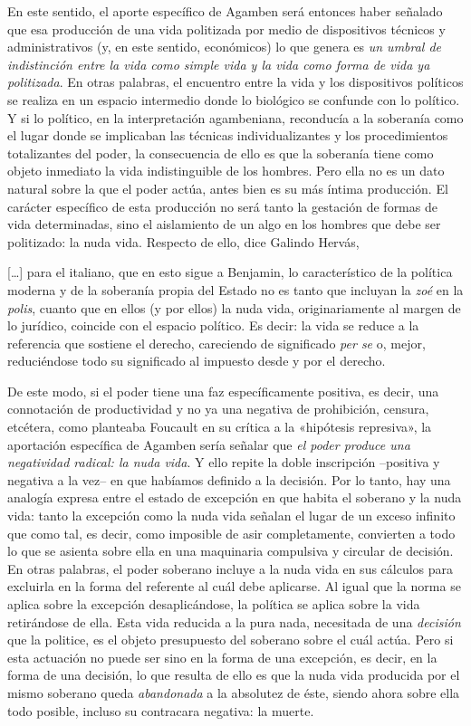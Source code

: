 En este sentido, el aporte específico de Agamben será entonces haber señalado que esa producción de una vida politizada por medio de dispositivos técnicos y administrativos (y, en este sentido, económicos) lo que genera es \emph{un umbral de indistinción entre la vida como simple vida y la vida como forma de vida ya politizada}. En otras palabras, el encuentro entre la vida y los dispositivos políticos se realiza en un espacio intermedio donde lo biológico se confunde con lo político. Y si lo político, en la interpretación agambeniana, reconducía a la soberanía como el lugar donde se implicaban las técnicas individualizantes y los procedimientos totalizantes del poder, la consecuencia de ello es que la soberanía tiene como objeto inmediato la vida indistinguible de los hombres. Pero ella no es un dato natural sobre la que el poder actúa, antes bien es su más íntima producción. El carácter específico de esta producción no será tanto la gestación de formas de vida determinadas, sino el aislamiento de un algo en los hombres que debe ser politizado: la nuda vida. Respecto de ello, dice Galindo Hervás,

{[}\ldots{]} para el italiano, que en esto sigue a Benjamin, lo característico de la política moderna y de la soberanía propia del Estado no es tanto que incluyan la \emph{zoé} en la \emph{polis}, cuanto que en ellos (y por ellos) la nuda vida, originariamente al margen de lo jurídico, coincide con el espacio político. Es decir: la vida se reduce a la referencia que sostiene el derecho, careciendo de significado \emph{per se }o, mejor, reduciéndose todo su significado al impuesto desde y por el derecho.

De este modo, si el poder tiene una faz específicamente positiva, es decir, una connotación de productividad y no ya una negativa de prohibición, censura, etcétera, como planteaba Foucault en su crítica a la «hipótesis represiva», la aportación específica de Agamben sería señalar que \emph{el poder produce una negatividad radical: la nuda vida}. Y ello repite la doble inscripción --positiva y negativa a la vez-- en que habíamos definido a la decisión. Por lo tanto, hay una analogía expresa entre el estado de excepción en que habita el soberano y la nuda vida: tanto la excepción como la nuda vida señalan el lugar de un exceso infinito que como tal, es decir, como imposible de asir completamente, convierten a todo lo que se asienta sobre ella en una maquinaria compulsiva y circular de decisión. En otras palabras, el poder soberano incluye a la nuda vida en sus cálculos para excluirla en la forma del referente al cuál debe aplicarse. Al igual que la norma se aplica sobre la excepción desaplicándose, la política se aplica sobre la vida retirándose de ella. Esta vida reducida a la pura nada, necesitada de una \emph{decisión} que la politice, es el objeto presupuesto del soberano sobre el cuál actúa. Pero si esta actuación no puede ser sino en la forma de una excepción, es decir, en la forma de una decisión, lo que resulta de ello es que la nuda vida producida por el mismo soberano queda \emph{abandonada }a la absolutez de éste, siendo ahora sobre ella todo posible, incluso su contracara negativa: la muerte.


